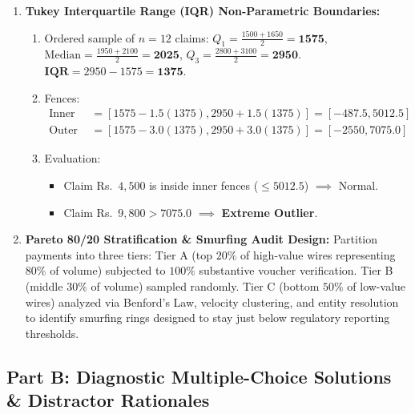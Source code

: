 \begin{enumerate}[label=\textbf{P6.\arabic*}]
    \item \textbf{Tukey Interquartile Range (IQR) Non-Parametric Boundaries:}
    \begin{enumerate}[label=(\alph*)]
        \item Ordered sample of $n = 12$ claims:
        $Q_1 = \frac{1500 + 1650}{2} = \mathbf{1575}$, $\text{Median} = \frac{1950 + 2100}{2} = \mathbf{2025}$, $Q_3 = \frac{2800 + 3100}{2} = \mathbf{2950}$.
        $\mathbf{IQR} = 2950 - 1575 = \mathbf{1375}$.
        \item Fences:
        \begin{align*}
        \text{Inner Fences} &= [1575 - 1.5(1375), 2950 + 1.5(1375)] = [-487.5, \mathbf{5012.5}] \\
        \text{Outer Fences} &= [1575 - 3.0(1375), 2950 + 3.0(1375)] = [-2550, \mathbf{7075.0}]
        \end{align*}
        \item Evaluation:
        \begin{itemize}
            \item Claim Rs.~$4{,}500$ is inside inner fences ($\le 5012.5$) $\implies$ Normal.
            \item Claim Rs.~$9{,}800 > 7075.0$ $\implies$ \textbf{Extreme Outlier}.
        \end{itemize}
    \end{enumerate}

    \item \textbf{Pareto 80/20 Stratification \& Smurfing Audit Design:}
    Partition payments into three tiers: Tier A (top $20\%$ of high-value wires representing $80\%$ of volume) subjected to $100\%$ substantive voucher verification. Tier B (middle $30\%$ of volume) sampled randomly. Tier C (bottom $50\%$ of low-value wires) analyzed via Benford's Law, velocity clustering, and entity resolution to identify smurfing rings designed to stay just below regulatory reporting thresholds.
\end{enumerate}

\subsection*{Part B: Diagnostic Multiple-Choice Solutions \& Distractor Rationales}

